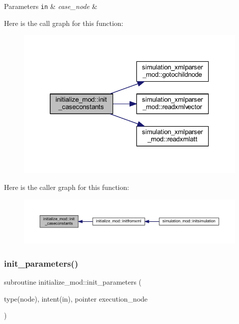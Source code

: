 \begin{DoxyParams}[1]{Parameters}
\mbox{\tt in}  & {\em case\+\_\+node} & \\
\hline
\end{DoxyParams}
Here is the call graph for this function\+:\nopagebreak
\begin{figure}[H]
\begin{center}
\leavevmode
\includegraphics[width=320pt]{namespaceinitialize__mod_a9d19665b9ac12c3db8b0842bfdb6fa0c_cgraph}
\end{center}
\end{figure}
Here is the caller graph for this function\+:\nopagebreak
\begin{figure}[H]
\begin{center}
\leavevmode
\includegraphics[width=350pt]{namespaceinitialize__mod_a9d19665b9ac12c3db8b0842bfdb6fa0c_icgraph}
\end{center}
\end{figure}
\mbox{\label{namespaceinitialize__mod_aac9d9dabb797c83e360f9ae60a7e65e3}} 
\subsubsection{\texorpdfstring{init\+\_\+parameters()}{init\_parameters()}}
{\footnotesize\ttfamily subroutine initialize\+\_\+mod\+::init\+\_\+parameters (\begin{DoxyParamCaption}\item[{type(node), intent(in), pointer}]{execution\+\_\+node }\end{DoxyParamCaption})\hspace{0.3cm}{\ttfamily [private]}}



